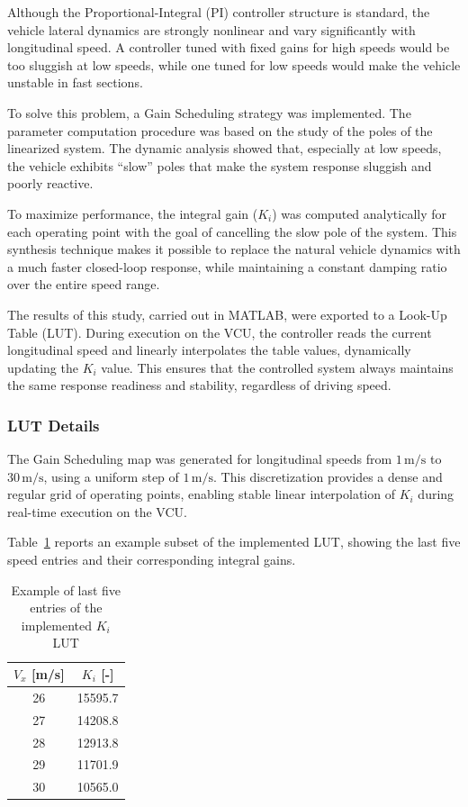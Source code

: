 \documentclass[12pt]{report}
\begin{document}
Although the Proportional-Integral (PI) controller structure is standard, the vehicle lateral dynamics are strongly nonlinear and vary significantly with longitudinal speed. A controller tuned with fixed gains for high speeds would be too sluggish at low speeds, while one tuned for low speeds would make the vehicle unstable in fast sections.

To solve this problem, a Gain Scheduling strategy was implemented. The parameter computation procedure was based on the study of the poles of the linearized system. The dynamic analysis showed that, especially at low speeds, the vehicle exhibits ``slow'' poles that make the system response sluggish and poorly reactive.

To maximize performance, the integral gain ($K_i$) was computed analytically for each operating point with the goal of cancelling the slow pole of the system. This synthesis technique makes it possible to replace the natural vehicle dynamics with a much faster closed-loop response, while maintaining a constant damping ratio over the entire speed range.

The results of this study, carried out in MATLAB, were exported to a Look-Up Table (LUT). During execution on the VCU, the controller reads the current longitudinal speed and linearly interpolates the table values, dynamically updating the $K_i$ value. This ensures that the controlled system always maintains the same response readiness and stability, regardless of driving speed.

\subsubsection{LUT Details}
\label{subsubsec:lut_details}

The Gain Scheduling map was generated for longitudinal speeds from $1\,\mathrm{m/s}$ to $30\,\mathrm{m/s}$, using a uniform step of $1\,\mathrm{m/s}$. This discretization provides a dense and regular grid of operating points, enabling stable linear interpolation of $K_i$ during real-time execution on the VCU.

Table~\ref{tab:ki_lut_last5} reports an example subset of the implemented LUT, showing the last five speed entries and their corresponding integral gains.

\begin{table}[htbp]
  \centering
  \caption{Example of last five entries of the implemented $K_i$ LUT}
  \label{tab:ki_lut_last5}
  \begin{tabular}{cc}
    \hline
    $V_x$ [m/s] & $K_i$ [-] \\
    \hline
    26 & 15595.7 \\
    27 & 14208.8 \\
    28 & 12913.8 \\
    29 & 11701.9 \\
    30 & 10565.0 \\
    \hline
  \end{tabular}
\end{table}
\end{document}
